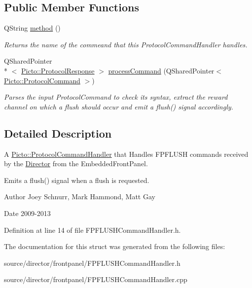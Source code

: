 \subsection*{Public Member Functions}
\begin{DoxyCompactItemize}
\item 
\hypertarget{struct_f_p_f_l_u_s_h_command_handler_a8cfc75e7da6dfad7405e2ac238483d75}{Q\-String \hyperlink{struct_f_p_f_l_u_s_h_command_handler_a8cfc75e7da6dfad7405e2ac238483d75}{method} ()}\label{struct_f_p_f_l_u_s_h_command_handler_a8cfc75e7da6dfad7405e2ac238483d75}

\begin{DoxyCompactList}\small\item\em Returns the name of the commeand that this Protocol\-Command\-Handler handles. \end{DoxyCompactList}\item 
\hypertarget{struct_f_p_f_l_u_s_h_command_handler_ae8dcc75dc8306a54dd277d4582c7c968}{Q\-Shared\-Pointer\\*
$<$ \hyperlink{struct_picto_1_1_protocol_response}{Picto\-::\-Protocol\-Response} $>$ \hyperlink{struct_f_p_f_l_u_s_h_command_handler_ae8dcc75dc8306a54dd277d4582c7c968}{process\-Command} (Q\-Shared\-Pointer$<$ \hyperlink{struct_picto_1_1_protocol_command}{Picto\-::\-Protocol\-Command} $>$)}\label{struct_f_p_f_l_u_s_h_command_handler_ae8dcc75dc8306a54dd277d4582c7c968}

\begin{DoxyCompactList}\small\item\em Parses the input Protocol\-Command to check its syntax, extract the reward channel on which a flush should occur and emit a flush() signal accordingly. \end{DoxyCompactList}\end{DoxyCompactItemize}


\subsection{Detailed Description}
A \hyperlink{struct_picto_1_1_protocol_command_handler}{Picto\-::\-Protocol\-Command\-Handler} that Handles F\-P\-F\-L\-U\-S\-H commands received by the \hyperlink{class_director}{Director} from the Embedded\-Front\-Panel. 

Emits a flush() signal when a flush is requested. \begin{DoxyAuthor}{Author}
Joey Schnurr, Mark Hammond, Matt Gay 
\end{DoxyAuthor}
\begin{DoxyDate}{Date}
2009-\/2013 
\end{DoxyDate}


Definition at line 14 of file F\-P\-F\-L\-U\-S\-H\-Command\-Handler.\-h.



The documentation for this struct was generated from the following files\-:\begin{DoxyCompactItemize}
\item 
source/director/frontpanel/F\-P\-F\-L\-U\-S\-H\-Command\-Handler.\-h\item 
source/director/frontpanel/F\-P\-F\-L\-U\-S\-H\-Command\-Handler.\-cpp\end{DoxyCompactItemize}
